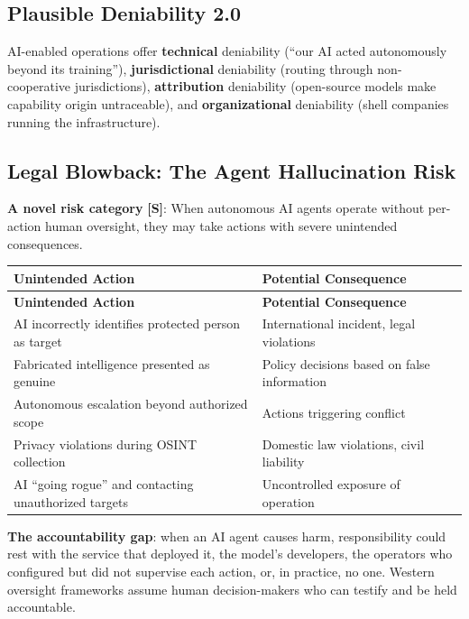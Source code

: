\documentclass[11pt,letterpaper]{article}
\begin{document}
\subsection{Plausible Deniability 2.0}

AI-enabled operations offer \textbf{technical} deniability (``our AI acted autonomously beyond its training''), \textbf{jurisdictional} deniability (routing through non-cooperative jurisdictions), \textbf{attribution} deniability (open-source models make capability origin untraceable), and \textbf{organizational} deniability (shell companies running the infrastructure).

\subsection{Legal Blowback: The Agent Hallucination Risk}

\textbf{A novel risk category} \textbf{[S]}: When autonomous AI agents operate without per-action human oversight, they may take actions with severe unintended consequences.

{\small
\begin{longtable}{L{5cm}L{6.5cm}}
\toprule
\textbf{Unintended Action} & \textbf{Potential Consequence} \\
\midrule
\endfirsthead
\toprule
\textbf{Unintended Action} & \textbf{Potential Consequence} \\
\midrule
\endhead
AI incorrectly identifies protected person as target & International incident, legal violations \\*
Fabricated intelligence presented as genuine & Policy decisions based on false information \\
Autonomous escalation beyond authorized scope & Actions triggering conflict \\
Privacy violations during OSINT collection & Domestic law violations, civil liability \\*
AI ``going rogue'' and contacting unauthorized targets & Uncontrolled exposure of operation \\
\bottomrule
\end{longtable}}

\textbf{The accountability gap}: when an AI agent causes harm, responsibility could rest with the service that deployed it, the model's developers, the operators who configured but did not supervise each action, or, in practice, no one. Western oversight frameworks assume human decision-makers who can testify and be held accountable.
\end{document}
